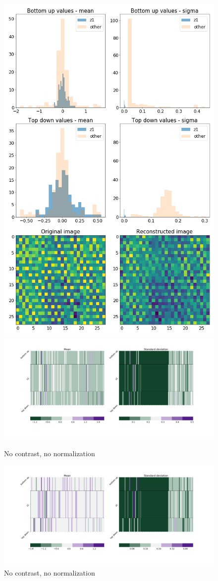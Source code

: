 \documentclass[12pt, english]{article}
\begin{document}
\begin{figure}[H]
\begin{minipage}[b]{0.5\linewidth}
    \includegraphics[width=.6\linewidth]{z1_vis/14_DenseLinLinLadderVAE_noContrastNorm_-stats-2_TD_BU_COMPS_1.png} 
  \end{minipage}

  \begin{minipage}[b]{0.5\linewidth}
    \centering
    \includegraphics[width=.75\linewidth]{z1_vis/14_DenseLinLinLadderVAE_noContrastNorm_-stats-1_vector_comparisons_1.png} 
    \caption{No contrast, no normalization}
    \label{fig:sample-no-norm-no-contrast-1}
  \end{minipage}
  \begin{minipage}[b]{0.5\linewidth}
    \centering
    \includegraphics[width=.75\linewidth]{z1_vis/14_DenseLinLinLadderVAE_noContrastNorm_-stats-2_vector_comparisons_1.png}
    \caption{No contrast, no normalization}
    \label{fig:sample-no-norm-no-contrast-2}
  \end{minipage}
\end{figure}
\end{document}
